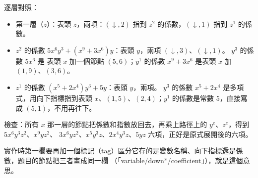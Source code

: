 \begin{pastsoln}
逐層對照：
\begin{itemize}
\item 第一層（$z$）：表頭 $z$，兩項：$(\downarrow, 2)$ 指到 $z^2$ 的係數，$(\downarrow, 1)$ 指到 $z^1$ 的係數。
\item $z^2$ 的係數 $5x^6y^3 + (x^9+3x^6)y$：表頭 $y$，兩項 $(\downarrow, 3)$、$(\downarrow, 1)$。 $y^3$ 的係數 $5x^6$ 是
表頭 $x$ 加一個節點 $(5, 6)$；$y^1$ 的係數 $x^9 + 3x^6$ 是表頭 $x$ 加 $(1, 9)$、$(3, 6)$。
\item $z^1$ 的係數 $(x^5+2x^4)y^3 + 5y$：表頭 $y$，兩項。 $y^3$ 的係數 $x^5 + 2x^4$ 是多項式，用向下指標指到表頭
$x$、$(1, 5)$、$(2, 4)$；$y^1$ 的係數是常數 $5$，直接寫成 $(5, 1)$，不用再往下。
\end{itemize}
檢查：所有 $x$ 那一層的節點把係數和指數放回去，再乘上路徑上的 $y^{e}$、$z^{e}$，得到 $5x^6y^3z^2$、$x^9yz^2$、
$3x^6yz^2$、$x^5y^3z$、$2x^4y^3z$、$5yz$ 六項，正好是原式展開後的六項。

實作時第一欄要再加一個標記（tag）區分它存的是變數名稱、向下指標還是係數，題目的節點把三者畫成同一欄
（「variable/down*/coefficient」），就是這個意思。
\end{pastsoln}
